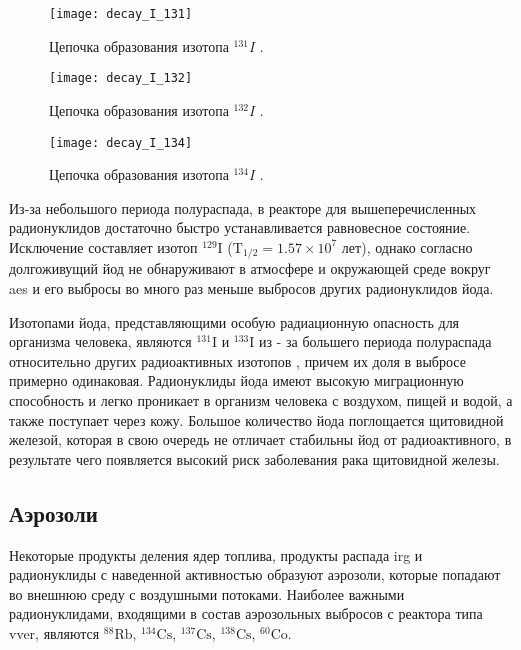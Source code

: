 \begin{figure}[ht!]
    \centering
    \texttt{[image: decay\_I\_131]}
    \captionsetup{justification=centering}
    \caption{Цепочка образования изотопа $^{131}I$ \cite{periodic_table}.}
    \label{fig_I_131_decay}
\end{figure}

\begin{figure}[ht!]
    \centering
    \texttt{[image: decay\_I\_132]}
    \captionsetup{justification=centering}
    \caption{Цепочка образования изотопа $^{132}I$ \cite{periodic_table}.}
    \label{fig_I_132_decay}
\end{figure}

\begin{figure}[ht!]
    \centering
    \texttt{[image: decay\_I\_134]}
    \captionsetup{justification=centering}
    \caption{Цепочка образования изотопа $^{134}I$ \cite{periodic_table}.}
    \label{fig_I_134_decay}
\end{figure}

Из-за небольшого периода полураспада, в реакторе для вышеперечисленных радионуклидов достаточно быстро устанавливается 
равновесное состояние. Исключение составляет изотоп $^{129}\text{I}$ ($\text{T}_{1/2} = 1.57 \times  10^7$ лет), однако 
согласно \cite{bekman_nuclear} долгоживущий йод не обнаруживают в атмосфере и окружающей среде вокруг \ac{aes} и его 
выбросы во много раз меньше выбросов других радионуклидов йода.

Изотопами йода, представляющими особую радиационную опасность для организма человека, являются $^{131}\text{I}$ и 
$^{133}\text{I}$ из - за большего периода полураспада относительно других радиоактивных изотопов \cite{nuc_waste}, 
причем их доля в выбросе примерно одинаковая. Радионуклиды йода имеют высокую миграционную способность и легко проникает 
в организм человека с воздухом, пищей и водой, а также поступает через кожу. Большое количество йода поглощается 
щитовидной железой, которая в свою очередь не отличает стабильны йод от радиоактивного, в результате чего появляется 
высокий риск заболевания рака щитовидной железы.

\subsection{Аэрозоли}

Некоторые продукты деления ядер топлива, продукты распада \ac{irg} и радионуклиды с наведенной активностью образуют 
аэрозоли, которые попадают во внешнюю среду с воздушными потоками. Наиболее важными радионуклидами, входящими в 
состав аэрозольных выбросов с реактора типа \ac{vver}, являются $^{88}\text{Rb}$, $^{134}\text{Cs}$, $^{137}\text{Cs}$, 
$^{138}\text{Cs}$, $^{60}\text{Co}$. 

